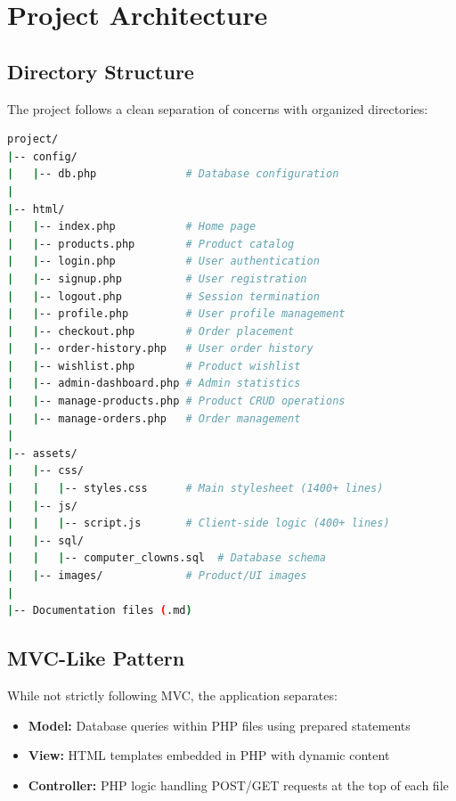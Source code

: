 \documentclass[12pt,a4paper]{article}
\begin{document}
\section{Project Architecture}

\subsection{Directory Structure}

The project follows a clean separation of concerns with organized directories:

\begin{lstlisting}[language=bash, caption=Project Directory Structure]
project/
|-- config/
|   |-- db.php              # Database configuration
|
|-- html/
|   |-- index.php           # Home page
|   |-- products.php        # Product catalog
|   |-- login.php           # User authentication
|   |-- signup.php          # User registration
|   |-- logout.php          # Session termination
|   |-- profile.php         # User profile management
|   |-- checkout.php        # Order placement
|   |-- order-history.php   # User order history
|   |-- wishlist.php        # Product wishlist
|   |-- admin-dashboard.php # Admin statistics
|   |-- manage-products.php # Product CRUD operations
|   |-- manage-orders.php   # Order management
|
|-- assets/
|   |-- css/
|   |   |-- styles.css      # Main stylesheet (1400+ lines)
|   |-- js/
|   |   |-- script.js       # Client-side logic (400+ lines)
|   |-- sql/
|   |   |-- computer_clowns.sql  # Database schema
|   |-- images/             # Product/UI images
|
|-- Documentation files (.md)
\end{lstlisting}

\subsection{MVC-Like Pattern}

While not strictly following MVC, the application separates:
\begin{itemize}
    \item \textbf{Model:} Database queries within PHP files using prepared statements
    \item \textbf{View:} HTML templates embedded in PHP with dynamic content
    \item \textbf{Controller:} PHP logic handling POST/GET requests at the top of each file
\end{itemize}
\end{document}
